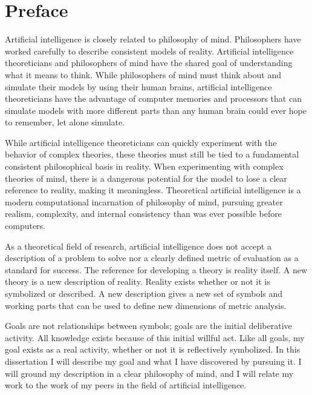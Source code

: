 

\chapter*{Preface}

Artificial intelligence is closely related to philosophy of mind.
Philosophers have worked carefully to describe consistent models of
reality.  Artificial intelligence theoreticians and philosophers of
mind have the shared goal of understanding what it means to think.
While philosophers of mind must think about and simulate their models
by using their human brains, artificial intelligence theoreticians
have the advantage of computer memories and processors that can
simulate models with more different parts than any human brain could
ever hope to remember, let alone simulate.

While artificial intelligence theoreticians can quickly experiment
with the behavior of complex theories, these theories must still be
tied to a fundamental consistent philosophical basis in reality.  When
experimenting with complex theories of mind, there is a dangerous
potential for the model to lose a clear reference to reality, making
it meaningless.  Theoretical artificial intelligence is a modern
computational incarnation of philosophy of mind, pursuing greater
realism, complexity, and internal consistency than was ever possible
before computers.

As a theoretical field of research, artificial intelligence does not
accept a description of a problem to solve nor a clearly defined
metric of evaluation as a standard for success.  The reference for
developing a theory is reality itself.  A new theory is a new
description of reality.  Reality exists whether or not it is
symbolized or described.  A new description gives a new set of symbols
and working parts that can be used to define new dimensions of metric
analysis.

Goals are not relationships between symbols; goals are the initial
deliberative activity.  All knowledge exists because of this initial
willful act.  Like all goals, my goal exists as a real activity,
whether or not it is reflectively symbolized.  In this dissertation I
will describe my goal and what I have discovered by pursuing it.  I
will ground my description in a clear philosophy of mind, and I will
relate my work to the work of my peers in the field of artificial
intelligence.

